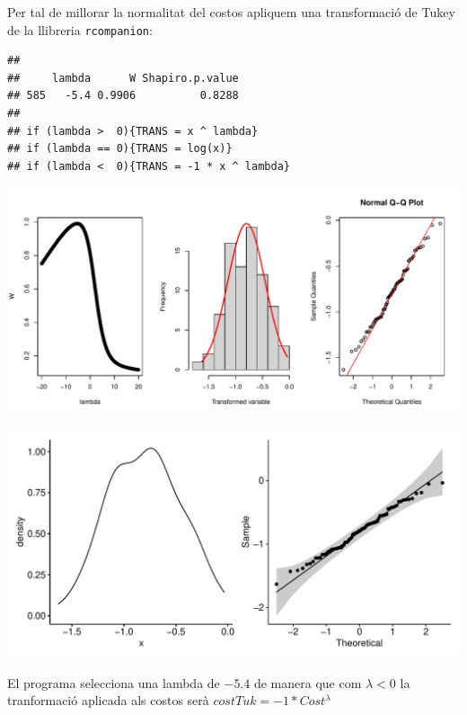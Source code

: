 \documentclass[11pt,a4paper]{article}\usepackage[]{graphicx}\usepackage[]{color}
\makeatletter
\def\maxwidth{ %
  \ifdim\Gin@nat@width>\linewidth
    \linewidth
  \else
    \Gin@nat@width
  \fi
}
\newenvironment{kframe}{%
 \def\at@end@of@kframe{}%
 \ifinner\ifhmode%
  \def\at@end@of@kframe{\end{minipage}}%
  \begin{minipage}{\columnwidth}%
 \fi\fi%
 \def\FrameCommand##1{\hskip\@totalleftmargin \hskip-\fboxsep
 \colorbox{shadecolor}{##1}\hskip-\fboxsep
     \hskip-\linewidth \hskip-\@totalleftmargin \hskip\columnwidth}%
 \MakeFramed {\advance\hsize-\width
   \@totalleftmargin\z@ \linewidth\hsize
   \@setminipage}}%
 {\par\unskip\endMakeFramed%
 \at@end@of@kframe}
\newenvironment{knitrout}{}{} %
\makeatother
\begin{document}
Per tal de millorar la normalitat del costos apliquem una transformació de Tukey de la llibreria \texttt{rcompanion}:
\begin{knitrout}
\color{fgcolor}\begin{kframe}
\begin{verbatim}
## 
##     lambda      W Shapiro.p.value
## 585   -5.4 0.9906          0.8288
## 
## if (lambda >  0){TRANS = x ^ lambda} 
## if (lambda == 0){TRANS = log(x)} 
## if (lambda <  0){TRANS = -1 * x ^ lambda}
\end{verbatim}
\end{kframe}
\includegraphics[width=\maxwidth]{figure/unnamed-chunk-17-1} 

\includegraphics[width=\maxwidth]{figure/unnamed-chunk-17-2} 

\end{knitrout}

El programa selecciona una lambda de $-5.4$ de manera que com $\lambda < 0$ la tranformació aplicada als costos serà $costTuk = -1 * Cost^{\lambda}$
\end{document}
